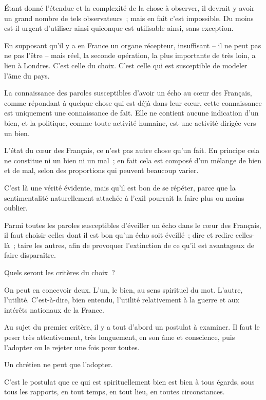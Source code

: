 \documentclass[french,twoside]{book} %
\begin{document}
Étant donné l'étendue et la complexité de la chose à observer, il devrait y avoir un grand nombre de tels observateurs ; mais en fait c'est impossible. Du moins est-il urgent d'utiliser ainsi quiconque est utilisable ainsi, sans exception.\par
En supposant qu'il y a en France un organe récepteur, insuffisant – il ne peut pas ne pas l'être – mais réel, la seconde opération, la plus importante de très loin, a lieu à Londres. C'est celle du choix. C'est celle qui est susceptible de modeler l'âme du pays.\par
La connaissance des paroles susceptibles d'avoir un écho au cœur des Français, comme répondant à quelque chose qui est déjà dans leur cœur, cette connaissance est uniquement une connaissance de fait. Elle ne contient aucune indication d'un bien, et la politique, comme toute activité humaine, est une activité dirigée vers un bien.\par
L'état du cœur des Français, ce n'est pas autre chose qu'un fait. En principe cela ne constitue ni un bien ni un mal ; en fait cela est composé d'un mélange de bien et de mal, selon des proportions qui peuvent beaucoup varier.\par
C'est là une vérité évidente, mais qu'il est bon de se répéter, parce que la sentimentalité naturellement attachée à l'exil pourrait la faire plus ou moins oublier.\par
Parmi toutes les paroles susceptibles d'éveiller un écho dans le cœur des Français, il faut choisir celles dont il est bon qu'un écho soit éveillé ; dire et redire celles-là ; taire les autres, afin de provoquer l'extinction de ce qu'il est avantageux de faire disparaître.\par
Quels seront les critères du choix ?\par
On peut en concevoir deux. L'un, le bien, au sens spirituel du mot. L'autre, l'utilité. C'est-à-dire, bien entendu, l'utilité relativement à la guerre et aux intérêts nationaux de la France.\par
Au sujet du premier critère, il y a tout d'abord un postulat à examiner. Il faut le peser très attentivement, très longuement, en son âme et conscience, puis l'adopter ou le rejeter une fois pour toutes.\par
Un chrétien ne peut que l'adopter.\par
C'est le postulat que ce qui est spirituellement bien est bien à tous égards, sous tous les rapports, en tout temps, en tout lieu, en toutes circonstances.\par
\end{document}
